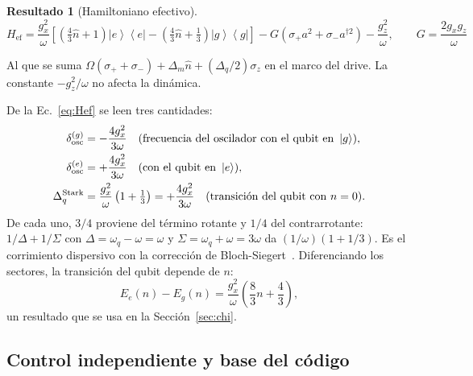 \documentclass[11pt,a4paper]{article}
\newcommand{\ket}[1]{\left|#1\right\rangle}
\newcommand{\bra}[1]{\left\langle#1\right|}
\newcommand{\spl}{\sigma_{+}}
\newcommand{\smi}{\sigma_{-}}
\newcommand{\Pe}{\ket{e}\!\bra{e}}
\newcommand{\Pg}{\ket{g}\!\bra{g}}
\newcommand{\hn}{\hat n}
\newcommand{\Href}{H_{\mathrm{ef}}}
\theoremstyle{definition}
\newtheorem{resultado}{Resultado}
\begin{document}
\begin{resultado}[Hamiltoniano efectivo]
\begin{equation}
\boxed{\Href=\frac{g_x^2}{\omega}\left[\left(\tfrac43\hn+1\right)\Pe-\left(\tfrac43\hn+\tfrac13\right)\Pg\right]-G\left(\spl a^2+\smi a^{\dagger2}\right)-\frac{g_z^2}{\omega},\qquad G=\frac{2g_xg_z}{\omega}}
\label{eq:Hef}
\end{equation}
\end{resultado}
Al que se suma $\Omega(\spl+\smi)+\Delta_m\hn+(\Delta_q/2)\sigma_z$ en el marco del drive. La constante $-g_z^2/\omega$ no afecta la dinámica.


De la Ec.~\eqref{eq:Hef} se leen tres cantidades:
\begin{align}
\delta_{\rm osc}^{(g)}&=-\frac{4g_x^2}{3\omega}\quad(\text{frecuencia del oscilador con el qubit en }\ket{g}),\\
\delta_{\rm osc}^{(e)}&=+\frac{4g_x^2}{3\omega}\quad(\text{con el qubit en }\ket{e}),\\
\Delta_q^{\rm Stark}&=\frac{g_x^2}{\omega}\left(1+\tfrac13\right)=+\frac{4g_x^2}{3\omega}\quad(\text{transición del qubit con }n=0).
\end{align}
De cada uno, $3/4$ proviene del término rotante y $1/4$ del contrarrotante: $1/\Delta+1/\Sigma$ con $\Delta=\omega_q-\omega=\omega$ y $\Sigma=\omega_q+\omega=3\omega$ da $(1/\omega)(1+1/3)$. Es el corrimiento dispersivo con la corrección de Bloch-Siegert~\cite{Zueco2009}. Diferenciando los sectores, la transición del qubit depende de $n$:
\begin{equation}
E_e(n)-E_g(n)=\frac{g_x^2}{\omega}\left(\frac83n+\frac43\right),
\label{eq:qubitn}
\end{equation}
un resultado que se usa en la Sección~\ref{sec:chi}.

\subsection{Control independiente y base del código}
\label{sec:polaron}
\end{document}
